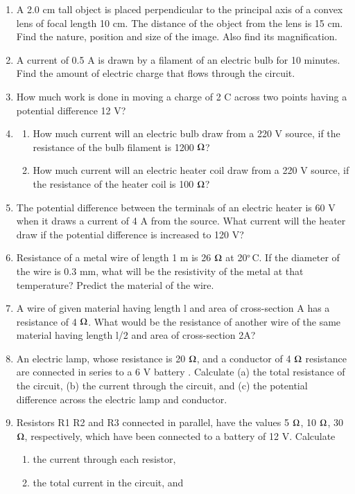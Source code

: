 \begin{enumerate}[label=\arabic*.,ref=\thesection.\theenumi]
\item  A 2.0 cm tall object is placed perpendicular to the principal axis of a convex lens of focal length 10 cm. The distance of the object from the lens is 15 cm. Find the nature, position and size of the image. Also find its magnification.
\item  A current of 0.5 A is drawn by a filament of an electric bulb for 10 minutes. Find the amount of electric charge that flows through the circuit.
\item  How much work is done in moving a charge of 2 C across two points having a potential difference 12 V?
\item  
\begin{enumerate}
\item  How much current will an electric bulb draw from a 220 V source, if the resistance of the bulb filament is 1200 $\ohm$?
\item   How much current will an electric heater coil draw from a 220 V source, if the resistance of the heater coil is 100 $\ohm$?
\end{enumerate}
\item  The potential difference between the terminals of an electric heater is 60 V when it draws a current of 4 A from the source. What current will the heater draw if the potential difference is increased to 120 V?
\item  Resistance of a metal wire of length 1 m is 26 $\ohm$ at 20$\degree$C. If the diameter of the wire is 0.3 mm, what will be the resistivity of the metal at that temperature? Predict the material of the wire.
\item  A wire of given material having length l and area of cross-section A has a resistance of 4 $\ohm$. What would be the resistance of another wire of the same material having length l/2 and area of cross-section 2A?
\item  An electric lamp, whose resistance is 20 $\ohm$, and a conductor of 4 $\ohm$ resistance are connected in series to a 6 V battery . Calculate (a) the total resistance of the circuit, (b) the current through the circuit, and (c) the potential difference across the electric lamp and conductor.
\item  Resistors R1 R2 and R3 connected in parallel, have the values 5 $\ohm$, 10 $\ohm$, 30 $\ohm$, respectively, which have been connected to a battery of 12 V. Calculate 
%
\begin{enumerate}
\item   the current through each resistor, 
\item   the total current in the circuit, and 

\end{enumerate}
\end{enumerate}
